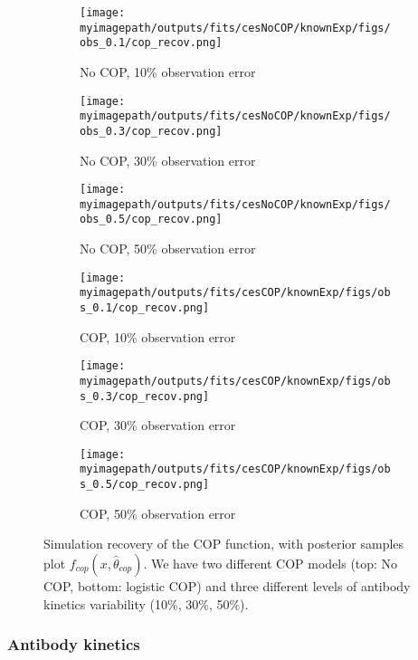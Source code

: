 \begin{figure}[H]
\label{fit1:cop}
    \centering
    \begin{subfigure}{0.31\textwidth}
        \centering
        \texttt{[image: \\myimagepath/outputs/fits/cesNoCOP/knownExp/figs/obs\_0.1/cop\_recov.png]}
        \caption{No COP, 10\% observation error}
    \end{subfigure}
    \begin{subfigure}{0.31\textwidth}
        \centering
        \texttt{[image: \\myimagepath/outputs/fits/cesNoCOP/knownExp/figs/obs\_0.3/cop\_recov.png]}
        \caption{No COP, 30\% observation error}
    \end{subfigure}
    \begin{subfigure}{0.31\textwidth}
        \centering
        \texttt{[image: \\myimagepath/outputs/fits/cesNoCOP/knownExp/figs/obs\_0.5/cop\_recov.png]}
        \caption{No COP, 50\% observation error}
    \end{subfigure}
    
  \begin{subfigure}{0.31\textwidth}
        \centering
        \texttt{[image: \\myimagepath/outputs/fits/cesCOP/knownExp/figs/obs\_0.1/cop\_recov.png]}
        \caption{ COP, 10\% observation error}
    \end{subfigure}
    \begin{subfigure}{0.31\textwidth}
        \centering
        \texttt{[image: \\myimagepath/outputs/fits/cesCOP/knownExp/figs/obs\_0.3/cop\_recov.png]}
        \caption{ COP, 30\% observation error}
    \end{subfigure}
    \begin{subfigure}{0.31\textwidth}
        \centering
        \texttt{[image: \\myimagepath/outputs/fits/cesCOP/knownExp/figs/obs\_0.5/cop\_recov.png]}
        \caption{ COP, 50\% observation error}
    \end{subfigure}
    
    \caption{Simulation recovery of the COP function, with posterior samples plot  $f_{cop}(x, \hat{\theta}_{cop})$. We have two different COP models (top: No COP, bottom: logistic COP) and three different levels of antibody kinetics variability (10\%, 30\%, 50\%).}
    \end{figure}


\subsubsection{Antibody kinetics}

